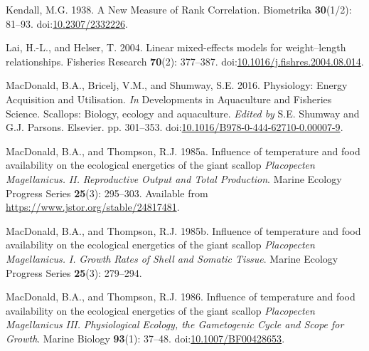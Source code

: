 \documentclass[
]{article}
\newlength{\cslhangindent}
\newlength{\cslentryspacingunit} %
\newenvironment{CSLReferences}[2] %
 {%
  \setlength{\parindent}{0pt}
  \ifodd #1
  \let\oldpar\par
  \def\par{\hangindent=\cslhangindent\oldpar}
  \fi
  \setlength{\parskip}{#2\cslentryspacingunit}
 }%
 {}
\begin{document}
\begin{CSLReferences}{1}{0}
\leavevmode{}%
Kendall, M.G. 1938. A {New Measure} of {Rank Correlation}. Biometrika \textbf{30}(1/2): 81--93. doi:\href{https://doi.org/10.2307/2332226}{10.2307/2332226}.

\leavevmode{}%
Lai, H.-L., and Helser, T. 2004. Linear mixed-effects models for weight--length relationships. Fisheries Research \textbf{70}(2): 377--387. doi:\href{https://doi.org/10.1016/j.fishres.2004.08.014}{10.1016/j.fishres.2004.08.014}.

\leavevmode{}%
MacDonald, B.A., Bricelj, V.M., and Shumway, S.E. 2016. Physiology: {Energy Acquisition} and {Utilisation}. \emph{In} Developments in {Aquaculture} and {Fisheries Science}. {Scallops}: Biology, ecology and aquaculture. \emph{Edited by} S.E. Shumway and G.J. Parsons. {Elsevier}. pp. 301--353. doi:\href{https://doi.org/10.1016/B978-0-444-62710-0.00007-9}{10.1016/B978-0-444-62710-0.00007-9}.

\leavevmode{}%
MacDonald, B.A., and Thompson, R.J. 1985a. Influence of temperature and food availability on the ecological energetics of the giant scallop {\emph{Placopecten}}{ \emph{Magellanicus}}{\emph{\emph{.}} }{\emph{\emph{II}}}{\emph{\emph{.}} }{\emph{\emph{Reproductive}}}{ \emph{\emph{Output and Total Production}}}. Marine Ecology Progress Series \textbf{25}(3): 295--303. Available from \url{https://www.jstor.org/stable/24817481}.

\leavevmode{}%
MacDonald, B.A., and Thompson, R.J. 1985b. Influence of temperature and food availability on the ecological energetics of the giant scallop {\emph{Placopecten}}{ \emph{Magellanicus}}{\emph{\emph{.}} }{\emph{\emph{I}}}{\emph{\emph{.}} }{\emph{\emph{Growth}}}{ \emph{\emph{Rates of Shell and Somatic Tissue}}}. Marine Ecology Progress Series \textbf{25}(3): 279--294.

\leavevmode{}%
MacDonald, B.A., and Thompson, R.J. 1986. Influence of temperature and food availability on the ecological energetics of the giant scallop {\emph{Placopecten}}{ \emph{Magellanicus}}{ \emph{\emph{}} }{\emph{\emph{III}}}{\emph{\emph{.}} }{\emph{\emph{Physiological}}}{ \emph{\emph{Ecology, the Gametogenic Cycle and Scope for Growth}}}. Marine Biology \textbf{93}(1): 37--48. doi:\href{https://doi.org/10.1007/BF00428653}{10.1007/BF00428653}.


\end{CSLReferences}
\end{document}
